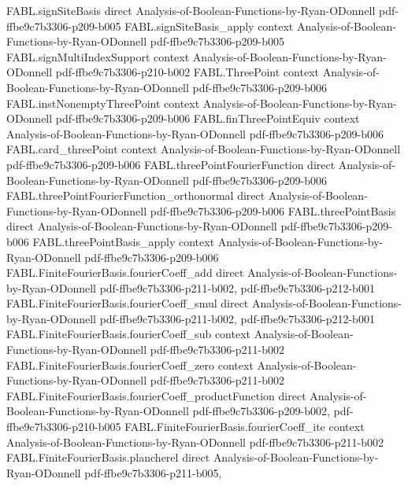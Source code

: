 \begin{theorem}
\proofstep
  {FABL.signSiteBasis}
  {direct}
  {Analysis-of-Boolean-Functions-by-Ryan-ODonnell}
  {pdf-ffbe9c7b3306-p209-b005}
\proofstep
  {FABL.signSiteBasis_apply}
  {context}
  {Analysis-of-Boolean-Functions-by-Ryan-ODonnell}
  {pdf-ffbe9c7b3306-p209-b005}
\proofstep
  {FABL.signMultiIndexSupport}
  {context}
  {Analysis-of-Boolean-Functions-by-Ryan-ODonnell}
  {pdf-ffbe9c7b3306-p210-b002}
\proofstep
  {FABL.ThreePoint}
  {context}
  {Analysis-of-Boolean-Functions-by-Ryan-ODonnell}
  {pdf-ffbe9c7b3306-p209-b006}
\proofstep
  {FABL.instNonemptyThreePoint}
  {context}
  {Analysis-of-Boolean-Functions-by-Ryan-ODonnell}
  {pdf-ffbe9c7b3306-p209-b006}
\proofstep
  {FABL.finThreePointEquiv}
  {context}
  {Analysis-of-Boolean-Functions-by-Ryan-ODonnell}
  {pdf-ffbe9c7b3306-p209-b006}
\proofstep
  {FABL.card_threePoint}
  {context}
  {Analysis-of-Boolean-Functions-by-Ryan-ODonnell}
  {pdf-ffbe9c7b3306-p209-b006}
\proofstep
  {FABL.threePointFourierFunction}
  {direct}
  {Analysis-of-Boolean-Functions-by-Ryan-ODonnell}
  {pdf-ffbe9c7b3306-p209-b006}
\proofstep
  {FABL.threePointFourierFunction_orthonormal}
  {direct}
  {Analysis-of-Boolean-Functions-by-Ryan-ODonnell}
  {pdf-ffbe9c7b3306-p209-b006}
\proofstep
  {FABL.threePointBasis}
  {direct}
  {Analysis-of-Boolean-Functions-by-Ryan-ODonnell}
  {pdf-ffbe9c7b3306-p209-b006}
\proofstep
  {FABL.threePointBasis_apply}
  {context}
  {Analysis-of-Boolean-Functions-by-Ryan-ODonnell}
  {pdf-ffbe9c7b3306-p209-b006}
\proofstep
  {FABL.FiniteFourierBasis.fourierCoeff_add}
  {direct}
  {Analysis-of-Boolean-Functions-by-Ryan-ODonnell}
  {pdf-ffbe9c7b3306-p211-b002,
    pdf-ffbe9c7b3306-p212-b001}
\proofstep
  {FABL.FiniteFourierBasis.fourierCoeff_smul}
  {direct}
  {Analysis-of-Boolean-Functions-by-Ryan-ODonnell}
  {pdf-ffbe9c7b3306-p211-b002,
    pdf-ffbe9c7b3306-p212-b001}
\proofstep
  {FABL.FiniteFourierBasis.fourierCoeff_sub}
  {context}
  {Analysis-of-Boolean-Functions-by-Ryan-ODonnell}
  {pdf-ffbe9c7b3306-p211-b002}
\proofstep
  {FABL.FiniteFourierBasis.fourierCoeff_zero}
  {context}
  {Analysis-of-Boolean-Functions-by-Ryan-ODonnell}
  {pdf-ffbe9c7b3306-p211-b002}
\proofstep
  {FABL.FiniteFourierBasis.fourierCoeff_productFunction}
  {direct}
  {Analysis-of-Boolean-Functions-by-Ryan-ODonnell}
  {pdf-ffbe9c7b3306-p209-b002,
    pdf-ffbe9c7b3306-p210-b005}
\proofstep
  {FABL.FiniteFourierBasis.fourierCoeff_ite}
  {context}
  {Analysis-of-Boolean-Functions-by-Ryan-ODonnell}
  {pdf-ffbe9c7b3306-p211-b002}
\proofstep
  {FABL.FiniteFourierBasis.plancherel}
  {direct}
  {Analysis-of-Boolean-Functions-by-Ryan-ODonnell}
  {pdf-ffbe9c7b3306-p211-b005,
}
\end{theorem}
